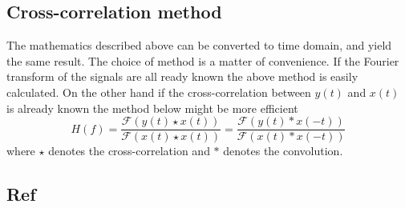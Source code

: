 \subsection{Cross-correlation method}
The mathematics described above can be converted to time domain, and yield the same result. The choice of method is a matter of convenience. If the Fourier transform of the signals are all ready known the above method is easily calculated. On the other hand if the cross-correlation between $y(t)$ and $x(t)$ is already known the method below might be more efficient
\begin{equation}
H(f)=\dfrac{\mathscr{F}(y(t)\star x(t))} {\mathscr{F}(x(t)\star x(t))}=
\dfrac{\mathscr{F}(y(t)\ast x(-t))} {\mathscr{F}(x(t)\ast x(-t))}
\label{Eq:Xcorr method}
\end{equation}  
where $\star $ denotes the cross-correlation and $\ast $ denotes the convolution. %

\subsection{Ref}
\cite{TutorialMeasurementPowerSpectra}
